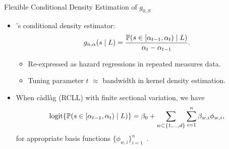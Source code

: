 \documentclass{beamer}
\begin{document}



\begin{frame}[c]{Flexible Conditional Density Estimation of $g_{0,S}$}

\begin{center}
\begin{itemize}
  \itemsep8pt
  \item \cite{diaz2011super}'s conditional density estimator:
    \begin{equation*}
      g_{n, \alpha}(s \mid L) = \frac{\mathbb{P} (s \in [\alpha_{t-1}, \alpha_t)
        \mid L)}{\alpha_t - \alpha_{t-1}}.
    \end{equation*}
    \vspace{-0.5em}
    \begin{itemize}
      \itemsep4pt
      \item Re-expressed as hazard regressions in repeated measures data.
      \item Tuning parameter $t$ $\approx$ bandwidth in kernel density
        estimation.
    \end{itemize}
  \item When c\`{a}dl\`{a}g (RCLL) with finite sectional variation, we have
    {\small{
    \begin{equation*}
     \operatorname{logit} \{\mathbb{P}(s \in [\alpha_{t-1}, \alpha_t) \mid L)\} = \beta_0 +
       \sum_{w \subset\{1,\ldots,d\}} \sum_{i=1}^{n} \beta_{w,i} \phi_{w,i},
    \end{equation*} }
    }
    for appropriate basis functions
    $\{ \phi_{w,i} \}_{i=1}^n$~\citep{gill1995inefficient}.
\end{itemize}
\end{center}

\note{
}

\end{frame}

\end{document}
